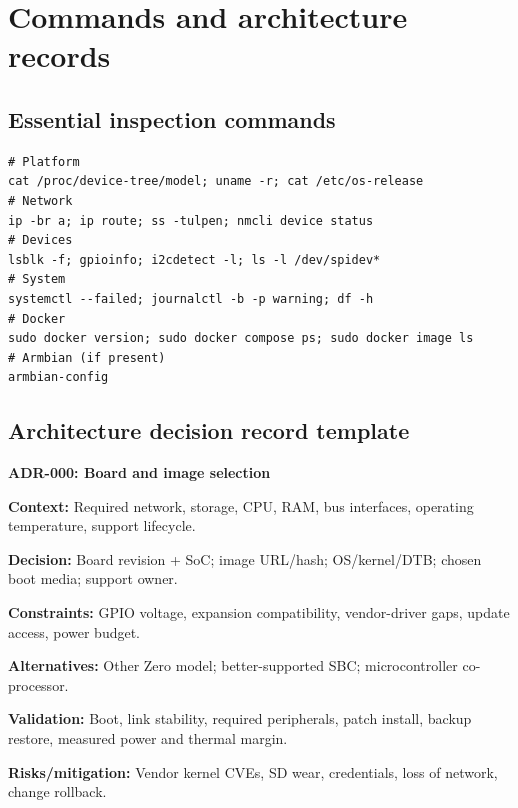 \documentclass[10pt,oneside,openany]{report}
\begin{document}
\chapter{Commands and architecture records}
\section{Essential inspection commands}
\begin{lstlisting}[style=sh]
# Platform
cat /proc/device-tree/model; uname -r; cat /etc/os-release
# Network
ip -br a; ip route; ss -tulpen; nmcli device status
# Devices
lsblk -f; gpioinfo; i2cdetect -l; ls -l /dev/spidev*
# System
systemctl --failed; journalctl -b -p warning; df -h
# Docker
sudo docker version; sudo docker compose ps; sudo docker image ls
# Armbian (if present)
armbian-config
\end{lstlisting}
\section{Architecture decision record template}
\begin{fieldnote}
\textbf{ADR-000: Board and image selection}\par
\textbf{Context:} Required network, storage, CPU, RAM, bus interfaces, operating temperature, support lifecycle.\par
\textbf{Decision:} Board revision + SoC; image URL/hash; OS/kernel/DTB; chosen boot media; support owner.\par
\textbf{Constraints:} GPIO voltage, expansion compatibility, vendor-driver gaps, update access, power budget.\par
\textbf{Alternatives:} Other Zero model; better-supported SBC; microcontroller co-processor.\par
\textbf{Validation:} Boot, link stability, required peripherals, patch install, backup restore, measured power and thermal margin.\par
\textbf{Risks/mitigation:} Vendor kernel CVEs, SD wear, credentials, loss of network, change rollback.
\end{fieldnote}
\end{document}
